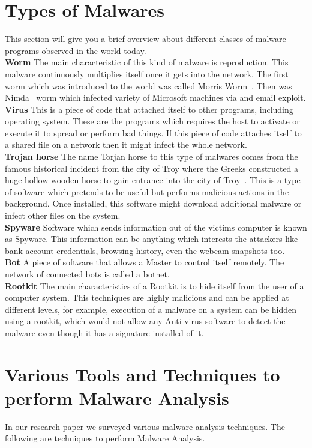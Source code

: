\documentclass[11pt]{article}
\begin{document}
	\section{Types of Malwares}
	This section will give you a brief overview about different classes of malware programs observed in the world today.\\ 
	\textbf{Worm} 
	The main characteristic of this kind of malware is reproduction. This malware continuously multiplies itself once it gets into the network. The first worm which was introduced to the world was called Morris Worm~\cite{spafford1989internet}. Then was Nimda~\cite{machie2001nimda} worm which infected variety of Microsoft machines via and email exploit.\\ 
	\textbf{Virus}
	This is a piece of code that attached itself to other programs, including operating system. These are the programs which requires the host to activate or execute it to spread or perform bad things. If this piece of code attaches itself to a shared file on a network then it might infect the whole network.\\
	\textbf{Trojan horse}
	The name Torjan horse to this type of malwares comes from the famous historical incident from the city of Troy where the Greeks constructed a huge hollow wooden horse to gain entrance into the city of Troy~\cite{trojanhorse}. This is a type of software which pretends to be useful but performs malicious actions in the background. Once installed, this software might download additional malware or infect other files on the system.\\
	\textbf{Spyware}
	Software which sends information out of the victims computer is known as Spyware. This information can be anything which interests the attackers like bank account credentials, browsing history, even the webcam snapshots too.\\
	\textbf{Bot}
	A piece of software that allows a Master to control itself remotely. The network of connected bots is called a botnet. \\
	\textbf{Rootkit}
	The main characteristics of a Rootkit is to hide itself from the user of a computer system. This techniques are highly malicious and can be applied at different levels, for example, execution of a malware on a system can be hidden using a rootkit, which would not allow any Anti-virus software to detect the malware even though it has a signature installed of it.\\
	
	\section{Various Tools and Techniques to perform Malware Analysis}
	In our research paper we surveyed various malware analysis techniques. The following are techniques to perform Malware Analysis.
\end{document}
